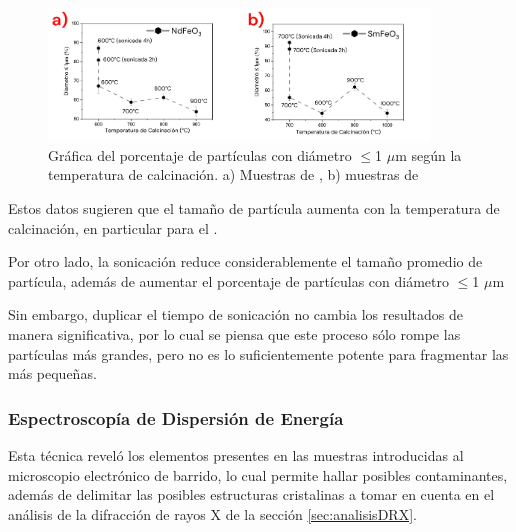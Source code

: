 \documentclass[../main.tex]{subfiles}
\begin{document}
\begin{figure}[H]
    \centering
    \includegraphics[width=0.9\textwidth]{fig/resporcentaje.png}
    \caption{Gráfica del porcentaje de partículas con diámetro $\leq$1 $\mu$m según la temperatura de calcinación. a) Muestras de \neod{}, b) muestras de \sama{}}
    \label{fig:resporcentaje}
\end{figure}
Estos datos sugieren que el tamaño de partícula aumenta con la temperatura de calcinación, en particular para el \neod{}.

Por otro lado, la sonicación reduce considerablemente el tamaño promedio de partícula, además de aumentar el porcentaje de partículas con diámetro $\leq$1 $\mu$m

Sin embargo, duplicar el tiempo de sonicación no cambia los resultados de manera significativa, por lo cual se piensa que este proceso sólo rompe las partículas más grandes, pero no es lo suficientemente potente para fragmentar las más pequeñas.
\subsubsection{Espectroscopía de Dispersión de Energía}
Esta técnica reveló los elementos presentes en las muestras introducidas al microscopio electrónico de barrido, lo cual permite hallar posibles contaminantes, además de delimitar las posibles estructuras cristalinas a tomar en cuenta en el análisis de la difracción de rayos X de la sección \ref{sec:analisisDRX}.
\end{document}
